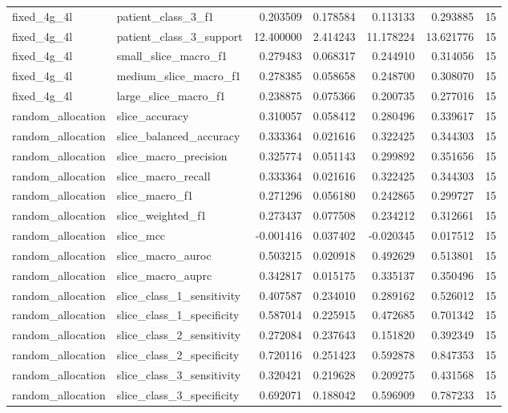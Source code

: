 \begin{tabular}{llrrrrr}
fixed_4g_4l & patient_class_3_f1 & 0.203509 & 0.178584 & 0.113133 & 0.293885 & 15 \\
fixed_4g_4l & patient_class_3_support & 12.400000 & 2.414243 & 11.178224 & 13.621776 & 15 \\
fixed_4g_4l & small_slice_macro_f1 & 0.279483 & 0.068317 & 0.244910 & 0.314056 & 15 \\
fixed_4g_4l & medium_slice_macro_f1 & 0.278385 & 0.058658 & 0.248700 & 0.308070 & 15 \\
fixed_4g_4l & large_slice_macro_f1 & 0.238875 & 0.075366 & 0.200735 & 0.277016 & 15 \\
random_allocation & slice_accuracy & 0.310057 & 0.058412 & 0.280496 & 0.339617 & 15 \\
random_allocation & slice_balanced_accuracy & 0.333364 & 0.021616 & 0.322425 & 0.344303 & 15 \\
random_allocation & slice_macro_precision & 0.325774 & 0.051143 & 0.299892 & 0.351656 & 15 \\
random_allocation & slice_macro_recall & 0.333364 & 0.021616 & 0.322425 & 0.344303 & 15 \\
random_allocation & slice_macro_f1 & 0.271296 & 0.056180 & 0.242865 & 0.299727 & 15 \\
random_allocation & slice_weighted_f1 & 0.273437 & 0.077508 & 0.234212 & 0.312661 & 15 \\
random_allocation & slice_mcc & -0.001416 & 0.037402 & -0.020345 & 0.017512 & 15 \\
random_allocation & slice_macro_auroc & 0.503215 & 0.020918 & 0.492629 & 0.513801 & 15 \\
random_allocation & slice_macro_auprc & 0.342817 & 0.015175 & 0.335137 & 0.350496 & 15 \\
random_allocation & slice_class_1_sensitivity & 0.407587 & 0.234010 & 0.289162 & 0.526012 & 15 \\
random_allocation & slice_class_1_specificity & 0.587014 & 0.225915 & 0.472685 & 0.701342 & 15 \\
random_allocation & slice_class_2_sensitivity & 0.272084 & 0.237643 & 0.151820 & 0.392349 & 15 \\
random_allocation & slice_class_2_specificity & 0.720116 & 0.251423 & 0.592878 & 0.847353 & 15 \\
random_allocation & slice_class_3_sensitivity & 0.320421 & 0.219628 & 0.209275 & 0.431568 & 15 \\
random_allocation & slice_class_3_specificity & 0.692071 & 0.188042 & 0.596909 & 0.787233 & 15 \\

\end{tabular}
